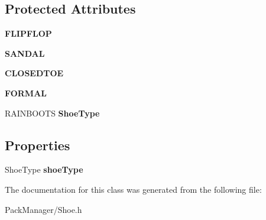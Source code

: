 \subsection*{Protected Attributes}
\begin{DoxyCompactItemize}
\item 
\hypertarget{interface_shoe_a20595e374d605ab93ba54f9304458c19}{{\bfseries F\-L\-I\-P\-F\-L\-O\-P}}\label{interface_shoe_a20595e374d605ab93ba54f9304458c19}

\item 
\hypertarget{interface_shoe_a107a0fe5a37146786f37f2ef641f3e89}{{\bfseries S\-A\-N\-D\-A\-L}}\label{interface_shoe_a107a0fe5a37146786f37f2ef641f3e89}

\item 
\hypertarget{interface_shoe_af3b751d906629b5a72c9b89a85c9c67b}{{\bfseries C\-L\-O\-S\-E\-D\-T\-O\-E}}\label{interface_shoe_af3b751d906629b5a72c9b89a85c9c67b}

\item 
\hypertarget{interface_shoe_afe52dac04ea02dcd5f49deef2a1e9972}{{\bfseries F\-O\-R\-M\-A\-L}}\label{interface_shoe_afe52dac04ea02dcd5f49deef2a1e9972}

\item 
\hypertarget{interface_shoe_ac002d3c88b877b8b1c7b11eb82ac93f6}{R\-A\-I\-N\-B\-O\-O\-T\-S {\bfseries Shoe\-Type}}\label{interface_shoe_ac002d3c88b877b8b1c7b11eb82ac93f6}

\end{DoxyCompactItemize}
\subsection*{Properties}
\begin{DoxyCompactItemize}
\item 
\hypertarget{interface_shoe_ade95c853c0a7a91a7ca9d5829764bfda}{Shoe\-Type {\bfseries shoe\-Type}}\label{interface_shoe_ade95c853c0a7a91a7ca9d5829764bfda}

\end{DoxyCompactItemize}


The documentation for this class was generated from the following file\-:\begin{DoxyCompactItemize}
\item 
Pack\-Manager/Shoe.\-h\end{DoxyCompactItemize}

